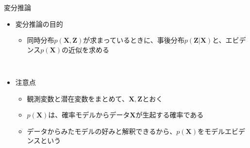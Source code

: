 \documentclass[dvipdfmx,notheorems,t]{beamer}
\begin{document}
\begin{frame}{変分推論}

\begin{itemize}
	\item 変分推論の目的
	\begin{itemize}
		\item 同時分布$p(\bm{X}, \bm{Z})$が求まっているときに、\alert{事後分布}$p(\bm{Z} | \bm{X})$と、\alert{エビデンス}$p(\bm{X})$の近似を求める
	\end{itemize} \
	
	\item 注意点
	\begin{itemize}
		\item 観測変数と潜在変数をまとめて、$\bm{X}, \bm{Z}$とおく
		\item $p(\bm{X})$は、確率モデルからデータ$\bm{X}$が生起する確率である
		\item \alert{データからみたモデルの好み}と解釈できるから、$p(\bm{X})$を\alert{モデルエビデンス}という
	\end{itemize}
\end{itemize}

\end{frame}
\end{document}
